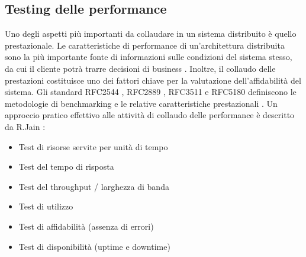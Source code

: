 \documentclass[../main.tex]{subfiles}
\begin{document}
\subsection{Testing delle performance}
Uno degli aspetti più importanti da collaudare in un sistema distribuito è quello prestazionale.
Le caratteristiche di performance di un'architettura distribuita sono la più importante fonte di informazioni sulle condizioni del sistema stesso, da cui il cliente potrà trarre decisioni di business \cite{disttest}.
Inoltre, il collaudo delle prestazioni costituisce uno dei fattori chiave per la valutazione dell'affidabilità del sistema.
Gli standard RFC2544 \cite{rfc2544}, RFC2889 \cite{rfc2889}, RFC3511 \cite{rfc3511} e RFC5180 \cite{rfc5180} definiscono le metodologie di benchmarking e le relative caratteristiche prestazionali \cite{disttest}.
Un approccio pratico effettivo alle attività di collaudo delle performance è descritto da R.Jain \cite{disttestJain}:
\begin{itemize}
\item Test di risorse servite per unità di tempo
\item Test del tempo di risposta
\item Test del throughput / larghezza di banda
\item Test di utilizzo
\item Test di affidabilità (assenza di errori)
\item Test di disponibilità (uptime e downtime)
\end{itemize}
\end{document}
